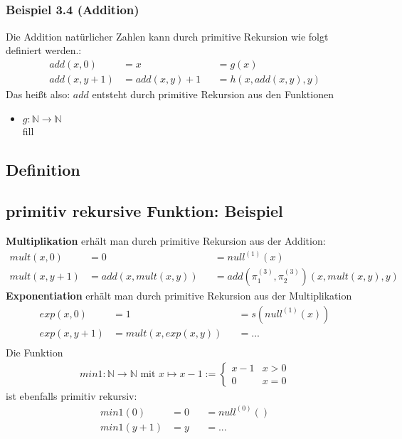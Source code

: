 \subsection{}
\subsubsection{Beispiel 3.4 (Addition)}
Die Addition natürlicher Zahlen kann durch primitive Rekursion wie folgt definiert werden.:
\begin{align*}
	add(x,0)&= x &&= g(x)\\
	add(x,y+1) &= add(x,y)+1 &&= h(x,add(x,y),y)
\end{align*}
Das heißt also: $add$ entsteht durch primitive Rekursion aus den Funktionen
\begin{itemize}
	\item $g: \mathbb{N} \to \mathbb{N} $\\fill
\end{itemize}
\subsection{Definition}
\subsection{primitiv rekursive Funktion: Beispiel}
\textbf{Multiplikation} erhält man durch primitive Rekursion aus der Addition:
\begin{align*}
	mult(x,0) &= 0&&=null^{(1)}(x)\\
	mult(x,y+1) &= add(x,mult(x,y)) &&= add(\pi_1^{(3)},\pi_2^{(3)})(x,mult(x,y),y)
\end{align*}
\textbf{Exponentiation} erhält man durch primitive Rekursion aus der Multiplikation
\begin{align*}
	exp(x,0) &= 1 &&= s(null^{(1)}(x))\\
	exp(x,y+1) &= mult(x,exp(x,y)) &&= ...\\
\end{align*}
Die Funktion
\begin{align*}
	min1:\mathbb{N} \to \mathbb{N} \text{ mit } x \mapsto x-1:= \begin{cases}
  x-1 &x>0\\
 0 &x = 0
\end{cases}
\end{align*}
ist ebenfalls primitiv rekursiv:
\begin{align*}
	min1(0) &= 0 &&= null^{(0)}()\\
	min1(y+1) &= y &&= ...
\end{align*}

